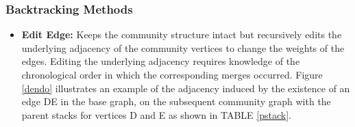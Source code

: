 \documentclass[conference]{IEEEtran}
\begin{document}
\subsubsection{Backtracking Methods}
\label{btmethods}
\begin{itemize}
\vspace{0.2cm}
 \item \textbf{Edit Edge:} Keeps the community structure intact but 
recursively edits the underlying adjacency of the community vertices to change 
the weights of the edges. Editing the underlying adjacency requires 
knowledge of the chronological order in which the corresponding merges 
occurred. Figure \ref{dendo} illustrates an example of the adjacency 
induced by the existence of an edge DE in the base graph, on the subsequent 
community graph with the parent stacks for vertices D and E as shown in TABLE 
\ref{pstack}.


\end{itemize}
\end{document}

